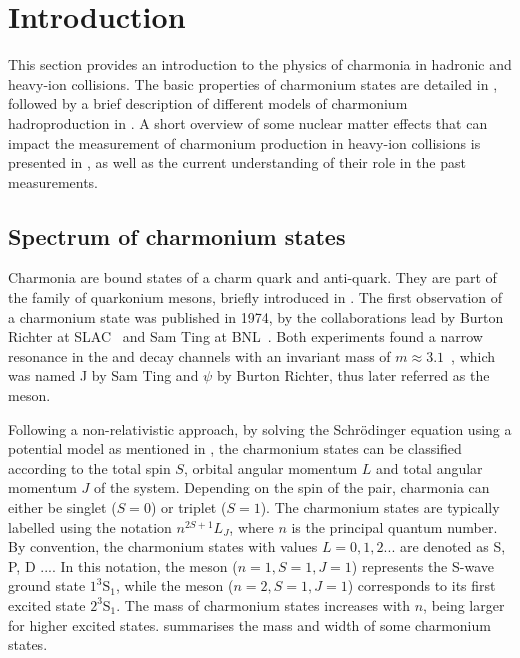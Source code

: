\section{Introduction}\label{sec:Charmonia_Theory}

This section provides an introduction to the physics of charmonia in hadronic and heavy-ion collisions. The basic properties of charmonium states are detailed in , followed by a brief description of different models of charmonium hadroproduction in . A short overview of some nuclear matter effects that can impact the measurement of charmonium production in heavy-ion collisions is presented in , as well as the current understanding of their role in the past measurements.

\subsection{Spectrum of charmonium states}\label{sec:Charmonia_Theory_CharmoniumStates}

Charmonia are bound states of a charm quark and anti-quark. They are part of the family of quarkonium mesons, briefly introduced in . The first observation of a charmonium state was published in 1974, by the collaborations lead by Burton Richter at SLAC~\cite{JPsiDiscovery_2} and Sam Ting at BNL~\cite{JPsiDiscovery}. Both experiments found a narrow resonance in the \elel and \mumu decay channels with an invariant mass of $m \approx 3.1$~\GeVcc, which was named J by Sam Ting and $\psi$ by Burton Richter, thus later referred as the \JPsi meson.

Following a non-relativistic approach, by solving the Schr{\"o}dinger equation using a \ccbar potential model as mentioned in , the charmonium states can be classified according to the total spin $S$, orbital angular momentum $L$ and total angular momentum $J$ of the \ccbar system.  Depending on the spin of the \ccbar pair, charmonia can either be singlet ($S = 0$) or triplet ($S = 1$). The charmonium states are typically labelled using the notation $n^{2S+1}L_{J}$, where $n$ is the principal quantum number. By convention, the charmonium states with values $L = 0, 1, 2 ...$ are denoted as {S, P, D ...}. In this notation, the \JPsi meson ($n=1, S=1, J=1$) represents the S-wave ground state $1^{3}\text{S}_{1}$, while the \PsiP meson ($n=2, S=1, J=1$) corresponds to its first excited state $2^{3}\text{S}_{1}$. The mass of charmonium states increases with $n$, being larger for higher excited states.  summarises the mass and width of some charmonium states.

